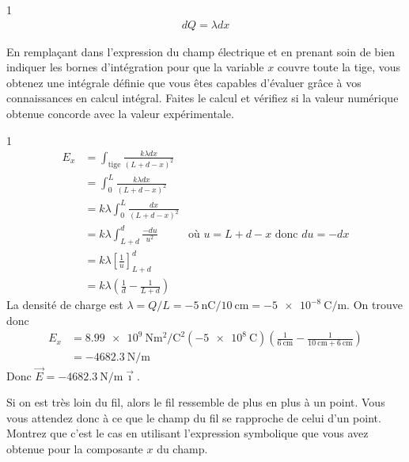 \documentclass{tufte-handout}
\newcommand{\xhat}{\vec{\imath}}
\newcommand{\vE}{\vec{E}}
\def\reponse{1}
\begin{document}
\if\reponse1
  {\color{tblue}
    \begin{align*}
      dQ = \lambda dx
    \end{align*}
  }
\else
  \vspace{1cm}
\fi

En remplaçant dans l'expression du champ électrique et en prenant soin de bien
indiquer les bornes d'intégration pour que la variable $x$ couvre toute la
tige, vous obtenez une intégrale définie que vous êtes capables d'évaluer grâce
à vos connaissances en calcul intégral. Faites le calcul et vérifiez si la
valeur numérique obtenue concorde avec la valeur expérimentale.

\if\reponse1
  {\color{tblue}
    \begin{align*}
      E_{x} &= \int_\mathrm{tige} \frac{k \lambda dx}{(L + d - x)^2} \\
            &= \int_0^L \frac{k \lambda dx}{(L + d - x)^2} \\
            &= k \lambda \int_0^L \frac{dx}{(L + d - x)^2} \\
            &= k \lambda \int_{L + d}^d \frac{-du}{u^2} &
              \text{où } u = L + d - x \text{ donc } du = -dx  \\
            &= k \lambda \left[ \frac{1}{u} \right]_{L + d}^d  \\
            &= k \lambda \left( \frac{1}{d} - \frac{1}{L + d} \right)
    \end{align*}
    La densité de charge est $\lambda = Q/L = \SI{-5}{\nano\coulomb} /
    \SI{10}{\centi\meter} = \SI{-5e-8}{\coulomb\per\meter}$. On trouve donc
    \begin{align*}
      E_x  &= \SI{8.99e9}{\newton\meter\squared\per\coulomb\squared}
              \left( \SI{-5e8}{\coulomb} \right) \left(
                \frac{1}{\SI{6}{\centi\meter}} - \frac{1}{\SI{10}{\centi\meter}
                  + \SI{6}{\centi\meter}} \right)  \\
           &= \SI{-4682.3}{\newton\per\meter}
    \end{align*}
    Donc $\vE = \SI{-4682.3}{\newton\per\meter}\xhat$.
  }
\else
  \vspace{10cm}
\fi

Si on est très loin du fil, alors le fil ressemble de plus en plus à un point.
Vous vous attendez donc à ce que le champ du fil se rapproche de celui d'un
point. Montrez que c'est le cas en utilisant l'expression symbolique que vous
avez obtenue pour la composante $x$ du champ.
\end{document}
